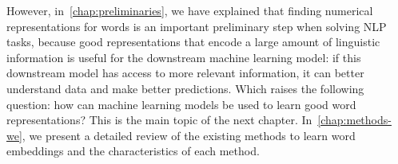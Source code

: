   However, in~\autoref{chap:preliminaries}, we have explained that finding
  numerical representations for words is an important preliminary step when
  solving NLP tasks, because good representations that encode a large amount of
  linguistic information is useful for the downstream machine learning model: if
  this downstream model has access to more relevant information, it can better
  understand data and make better predictions. Which raises the following
  question: how can machine learning models be used to learn good word
  representations?  This is the main topic of the next chapter.
  In~\autoref{chap:methods-we}, we present a detailed review of the existing
  methods to learn word embeddings and the characteristics of each method.
